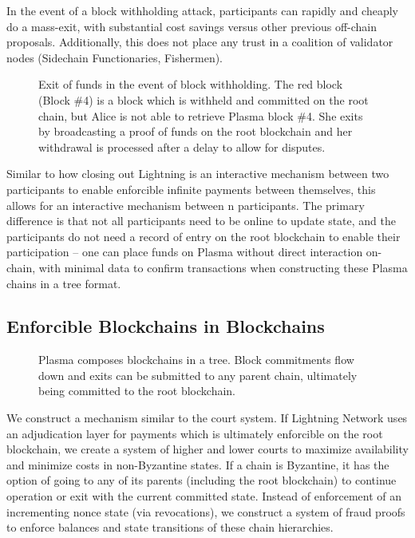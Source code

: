 \documentclass[letterpaper, 11pt]{article}
\begin{document}
In the event of a block withholding attack, participants can rapidly and cheaply
do a mass-exit, with substantial cost savings versus other previous off-chain
proposals. Additionally, this does not place any trust in a coalition of
validator nodes (Sidechain Functionaries, Fishermen).

\begin{figure}[H]
	\caption{
		Exit of funds in the event of block withholding. The red block
		(Block \#4) is a block which is withheld and committed on the
		root chain, but Alice is not able to retrieve Plasma block \#4.
		She exits by broadcasting a proof of funds on the root
		blockchain and her withdrawal is processed after a delay to
		allow for disputes.
		}
\end{figure}

Similar to how closing out Lightning is an interactive mechanism between two
participants to enable enforcible infinite payments between themselves, this
allows for an interactive mechanism between n participants. The primary
difference is that not all participants need to be online to update state, and
the participants do not need a record of entry on the root blockchain to enable
their participation -- one can place funds on Plasma without direct interaction
on-chain, with minimal data to confirm transactions when constructing these
Plasma chains in a tree format.

\subsection{Enforcible Blockchains in Blockchains}

\begin{figure}[H]
	\caption{
		Plasma composes blockchains in a tree. Block commitments flow
		down and exits can be submitted to any parent chain, ultimately
		being committed to the root blockchain.
		}
\end{figure}

We construct a mechanism similar to the court system. If Lightning Network uses
an adjudication layer for payments which is ultimately enforcible on the root
blockchain, we create a system of higher and lower courts to maximize
availability and minimize costs in non-Byzantine states. If a chain is
Byzantine, it has the option of going to any of its parents (including the root
blockchain) to continue operation or exit with the current committed state.
Instead of enforcement of an incrementing nonce state (via revocations), we
construct a system of fraud proofs to enforce balances and state transitions of
these chain hierarchies.
\end{document}
